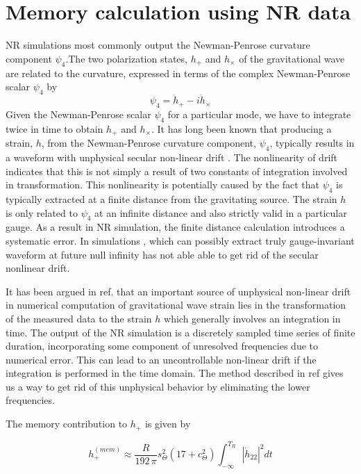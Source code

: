 \documentclass[twocolumn,showpacs,aps,prd,nobibnotes,floatfix]{revtex4-1}
\begin{document}
\section{Memory calculation using NR data}
NR simulations most commonly output the Newman-Penrose curvature component $\psi_4$.The two polarization states, $h_{+}$ and $h_{\times}$ of the gravitational wave are related to the curvature, expressed in terms 	of the complex Newman-Penrose scalar $\psi_4$ by 
\begin{equation}
\psi_4 = \ddot{h}_+ - \mathit{i}\ddot{h}_{\times}
\end{equation}
Given the Newman-Penrose scalar $\psi_4$ for a particular mode, we have to integrate twice in time to obtain $h_{+}$ and $h_{\times}$. It has long been known that producing a strain, $h$, from the Newman-Penrose curvature component, $\psi_4$, typically results in a waveform with unphysical secular non-linear drift \cite{Berti2007}. The nonlinearity of drift indicates that this is not simply a result of two constants of integration involved in transformation. This nonlinearity is potentially caused by the fact that $\psi_4$ is typically extracted at a finite distance from the gravitating source. The strain $h$ is only related to $\psi_4$ at an infinite distance and also strictly valid in a particular gauge. As a result in NR simulation, the finite distance calculation introduces a systematic error. In simulations \cite{Hannam2009, Reisswig2009}, which can possibly extract truly gauge-invariant waveform at future null infinity has not able able to get rid of the secular nonlinear drift.

\par It has been argued in ref. \cite{Reisswig_Pollney2011} that an important source of unphysical non-linear drift in numerical computation of gravitational wave strain lies in the transformation of the measured data to the strain $h$  which generally involves an integration in time. The output of the NR simulation is a discretely sampled time series of finite duration, incorporating some component of unresolved frequencies due to numerical error. This can lead to an uncontrollable non-linear drift if the integration is performed in the time domain. The method described in ref \cite{Reisswig_Pollney2011} gives us a way to get rid of this unphysical behavior by eliminating the lower frequencies.    
\par The memory contribution to $h_{+}$ is given by \cite{Favata2010}

\begin{equation}\label{eq:3.2}
h_{+}^{(mem)} \approx \frac{R}{192 \, \pi}s_{\Theta}^{2}\left(17 +c_{\Theta}^{2} \right)\int_{-\infty}^{T_R}|\dot{h}_{22}|^2 dt
\end{equation}
\end{document}
